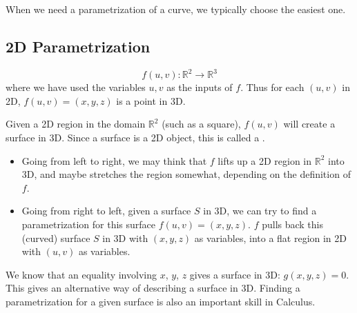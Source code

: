 When we need a parametrization of a curve, we typically choose the easiest one.

\subsection*{2D Parametrization}

$$f(u, v): \mathbb{R}^2 \to \mathbb{R}^3$$ where we have used the variables $u, v$ as the inputs of $f$. Thus for each $(u, v)$ in 2D, $f(u, v) = (x, y, z)$ is a point in 3D. 

Given a 2D region in the domain $\mathbb{R}^2$ (such as a square), $f(u, v)$ will create a surface in 3D. Since a surface is a 2D object, this is called a . 

\begin{itemize}
    \item Going from left to right, we may think that $f$ lifts up a 2D region in $\mathbb{R}^2$ into 3D, and maybe stretches the region somewhat, depending on the definition of $f$.
    
    \item Going from right to left, given a surface $S$ in 3D, we can try to find a parametrization for this surface $f(u, v) = (x, y, z)$. $f$ pulls back this (curved) surface $S$ in 3D with $(x, y, z)$ as variables, into a flat region in 2D with $(u, v)$ as variables.
\end{itemize}

We know that an equality involving $x$, $y$, $z$ gives a surface in 3D: $g(x, y, z) = 0$. This gives an alternative way of describing a surface in 3D. Finding a parametrization for a given surface is also an important skill in Calculus.

